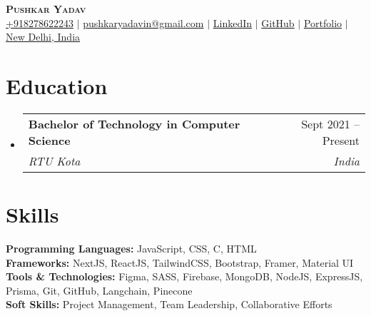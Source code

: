 \documentclass[letterpaper,11pt]{article}
\makeatletter
\newcommand{\resumeEducationHeading}[4]{
  \vspace{-2pt}\item
    \begin{tabular*}{0.97\textwidth}[t]{l@{\extracolsep{\fill}}r}
      \textbf{#1} & #2 \\
      \textit{\small#3} & \textit{\small #4} \\
    \end{tabular*}\vspace{-5pt}
}
\newcommand{\resumeSubHeadingListStart}{\begin{itemize}[leftmargin=0.15in, label={}]}
\newcommand{\resumeSubHeadingListEnd}{\end{itemize}}
\makeatother
\begin{document}

\begin{center}
    \textbf{\Huge \scshape Pushkar Yadav} \\ \vspace{3pt}
    \small
    \faMobile \hspace{.5pt} \href{tel:918278622243}{+918278622243}
    $|$
    \faAt \hspace{.5pt} \href{mailto:pushkaryadavin@gmail.com}{pushkaryadavin@gmail.com}
    $|$
    \faLinkedinSquare \hspace{.5pt} \href{https://www.linkedin.com/in/pushkarydv/}{LinkedIn}
    $|$
    \faGithub \hspace{.5pt} \href{http://github.com/pushkarydv}{GitHub}
    $|$
    \faGlobe \hspace{.5pt} \href{https://pushkaryadav.in}{Portfolio}
    $|$
    \faMapMarker \hspace{.5pt} \href{https://www.google.com/maps/place/new+delhi+india/data=!4m2!3m1!1s0x390cfd5b347eb62d:0x52c2b7494e204dce?sa=X&ved=1t:155783&ictx=111}{New Delhi, India}
\end{center}


\section{Education}
  \vspace{2pt}
  \resumeSubHeadingListStart
    \resumeEducationHeading
      {Bachelor of Technology in Computer Science}{Sept 2021 -- Present}
      {RTU Kota}{India}
  \resumeSubHeadingListEnd


\section{Skills}
  \vspace{2pt}
  \resumeSubHeadingListStart
    \small{\item{
         \textbf{Programming Languages:}{ JavaScript, CSS, C, HTML} \\ \vspace{3pt}
         \textbf{Frameworks:}{ NextJS, ReactJS, TailwindCSS, Bootstrap, Framer, Material UI} \\ \vspace{3pt}
         \textbf{Tools \& Technologies:}{ Figma, SASS, Firebase, MongoDB, NodeJS, ExpressJS, Prisma, Git, GitHub, Langchain, Pinecone} \\ \vspace{3pt}
         \textbf{Soft Skills:}{ Project Management, Team Leadership, Collaborative Efforts} \\ \vspace{3pt}
    }}
  \resumeSubHeadingListEnd
\end{document}
